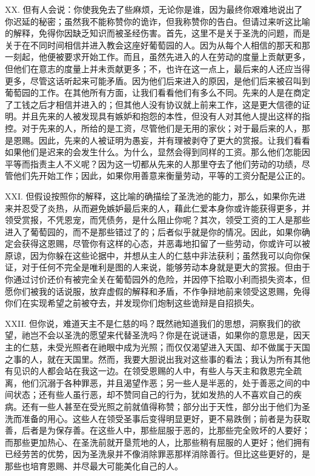 XX. 但有人会说：你使我免去了些麻烦，无论你是谁，因为最终你艰难地说出了你迟延的秘密；虽然我不能称赞你的诡诈，但我称赞你的告白。但请过来听这比喻的解释，免得你因缺乏知识而被圣经伤害。首先，这里不是关于圣洗的问题，而是关于在不同时间相信并进入教会这座好葡萄园的人。因为从每个人相信的那天和那一刻起，他便被要求开始工作。而且，虽然先进入的人在劳动的度量上贡献更多，但他们在意志的度量上并未贡献更多；不，也许在这一点上，最后来的人还应当得更多，尽管这话听起来可能矛盾。因为他们后来进入的原因，是他们后来被召叫到葡萄园的工作。在其他所有方面，让我们看看他们有多么不同。先来的人是在商定了工钱之后才相信并进入的；但其他人没有协议就上前来工作，这是更大信德的证明。并且先来的人被发现具有嫉妒和抱怨的本性，但没有人对其他人提出这样的指控。对于先来的人，所给的是工资，尽管他们是无用的家伙；对于最后来的人，那是恩赐。因此，先来的人被证明为愚妄，并有理被剥夺了更大的赏报。让我们看看如果他们是迟来的会发生什么。为什么，显然会得到同样的工资。那么他们怎能因平等而指责主人不义呢？因为这一切都从先来的人那里夺去了他们劳动的功绩，尽管他们先开始工作；因此，如果你用善意来衡量劳动，平等的工资分配是公正的。\par

XXI. 但假设按照你的解释，这比喻的确描绘了圣洗池的能力，那么，如果你先进来并忍受了炎热，从而避免嫉妒最后来的人，藉此仁爱本身你或许能获得更多，并领受赏报，不凭恩宠，而凭债务，是什么阻止你呢？其次，领受工资的工人是那些进入了葡萄园的，而不是那些错过了的；后者似乎就是你的情况。因此，如果你确定会获得这恩赐，尽管你有这样的心态，并恶毒地扣留了一些劳动，你或许可以被原谅，因为你躲在这些论据中，并想从主人的仁慈中非法获利；虽然我可以向你保证，对于任何不完全是唯利是图的人来说，能够劳动本身就是更大的赏报。但由于你通过讨价还价有被完全关在葡萄园外的危险，并因停下拾取小利而损失资本，但愿你们被我的话说服，放弃虚假的解释和矛盾，不作争辩地前来领受这恩赐，免得你们在实现希望之前被夺去，并发现你们炮制这些诡辩是自招损失。\par

XXII. 但你说，难道天主不是仁慈的吗？既然祂知道我们的思想，洞察我们的欲望，祂岂不会以圣洗的愿望来代替圣洗吗？你是在说谜语，如果你的意思是，因天主的仁慈，未受光照者在祂眼中成为光照；而仅仅渴望进入天国、却不做属于天国之事的人，就在天国里。然而，我要大胆说出我对这些事的看法；我认为所有其他有见识的人都会站在我这一边。在领受恩赐的人中，有些人与天主和救恩完全疏离，他们沉溺于各种罪恶，并且渴望作恶；另一些人是半恶的，处于善恶之间的中间状态；还有些人虽行恶，却不赞同自己的行为，犹如发热的人不喜欢自己的疾病。还有一些人甚至在受光照之前就值得称赞；部分出于天性，部分出于他们为圣洗而准备的用心。这些人在领受圣事后变得明显更好，更不易跌倒；前者是为获取善，后者是为保存善。在这些人中，那些屈服于恶的，比那些完全败坏的人要好；而那些更加热心、在圣洗前就开垦荒地的人，比那些稍有屈服的人更好；他们拥有已经劳苦的优势，因为圣洗泉并不像消除罪恶那样消除善行。但比这些更好的，是那些也培育恩赐、并尽最大可能美化自己的人。\par


